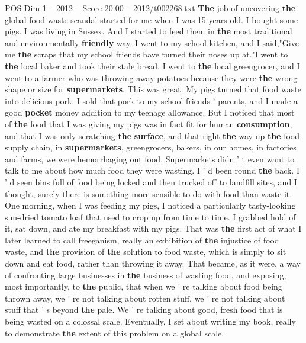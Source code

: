 \begin{textsample}{POS Dim 1 – 2012 – Score 20.00 – 2012/t002268.txt}  \label{ex:f1_pos_037}
\textbf{The} job of uncovering \textbf{the} global food waste scandal started for me when I was 15 years old.
I bought some pigs.
I was living in Sussex.
And I started to feed them in \textbf{the} most traditional and environmentally \textbf{friendly} way.
I went to my school kitchen, and I said,"Give me \textbf{the} scraps that my school friends have turned their noses up at."I went to \textbf{the} local baker and took their stale bread.
I went to \textbf{the} local greengrocer, and I went to a farmer who was throwing away potatoes because they were \textbf{the} wrong shape or size for \textbf{supermarkets}.
This was great.
My pigs turned that food waste into delicious pork.
I sold that pork to my school friends ' parents, and I made a good \textbf{pocket} money addition to my teenage allowance.
But I noticed that most of \textbf{the} food that I was giving my pigs was in fact fit for human \textbf{consumption}, and that I was only scratching \textbf{the} \textbf{surface}, and that right \textbf{the} way up \textbf{the} food supply chain, in \textbf{supermarkets}, greengrocers, bakers, in our homes, in factories and farms, we were hemorrhaging out food.
Supermarkets didn ' t even want to talk to me about how much food they were wasting.
I ' d been round \textbf{the} back.
I ' d seen bins full of food being locked and then trucked off to landfill sites, and I thought, surely there is something more sensible to do with food than waste it.
One morning, when I was feeding my pigs, I noticed a particularly tasty-looking sun-dried tomato loaf that used to crop up from time to time.
I grabbed hold of it, sat down, and ate my breakfast with my pigs.
That was \textbf{the} first act of what I later learned to call freeganism, really an exhibition of \textbf{the} injustice of food waste, and \textbf{the} provision of \textbf{the} solution to food waste, which is simply to sit down and eat food, rather than throwing it away.
That became, as it were, a way of confronting large businesses in \textbf{the} business of wasting food, and exposing, most importantly, to \textbf{the} public, that when we ' re talking about food being thrown away, we ' re not talking about rotten stuff, we ' re not talking about stuff that ' s beyond \textbf{the} pale.
We ' re talking about good, fresh food that is being wasted on a colossal scale.
Eventually, I set about writing my book, really to demonstrate \textbf{the} extent of this problem on a global scale.

\end{textsample}
